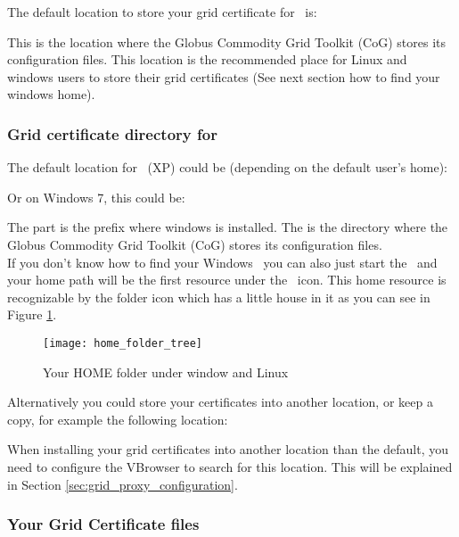  The default location to store your grid certificate for \Linux\ is:
 
 	\tab {}  

 This is the location where the Globus Commodity Grid Toolkit (CoG) stores its
 configuration files. This location is the recommended place for Linux and
 windows users to store their grid certificates (See next section how to find
 your windows home).
 
\subsubsection{Grid certificate directory for \windows}
 
 The default location for \windows\ (XP) could be (depending on the default
 user's home): 
 
	 \tab {}

 Or on Windows 7, this could be: 
 
 	 \tab {}
 	
 The  part is the prefix where windows is installed. 
 The  is the directory where the Globus Commodity Grid
 Toolkit (CoG) stores its  configuration files. \\
 If you don't know how to find your Windows \HOME\ you can also just start the
 \vbrowser\ and your home path will be the first resource under the \LocalSys\ icon. 
 This home resource is recognizable by the folder icon
 which has a little house in it as you can see in Figure \ref{fig:home_folder_in_tree}.
 
  \begin{figure}[htbp]
  \centerline{\texttt{[image: home\_folder\_tree]}}
  \caption{Your HOME folder under window and Linux}
  \label{fig:home_folder_in_tree}
 \end{figure}
 
 Alternatively you could store your certificates into
 another location, or keep a copy, for example the following location:
 
 	 \tab {}
 
 When installing your grid certificates into another location than the default, 
 you need to configure the VBrowser to search for this location. 
 This will be explained in Section \ref{sec:grid_proxy_configuration}. 
 
\subsubsection{Your Grid Certificate files}


